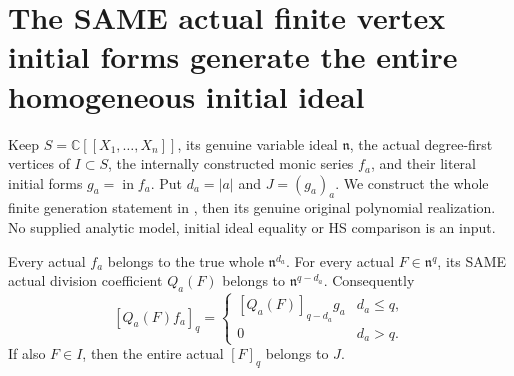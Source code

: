 \section{The SAME actual finite vertex initial forms generate the entire homogeneous initial ideal}

Keep $S=\mathbb C[[X_1,\ldots,X_n]]$, its genuine variable ideal
$\mathfrak n$, the actual degree-first vertices of $I\subset S$,
the internally constructed monic series $f_a$, and their literal initial
forms $g_a=\operatorname{in}f_a$. Put $d_a=|a|$ and $J=(g_a)_a$.
We construct the whole finite generation statement in
\cite[Remark~7.6, p.~263]{bierstone-milman97-invent-math}, then its
genuine original polynomial realization. No supplied analytic model,
initial ideal equality or HS comparison is an input.

\begin{lemma}
\label{hir:actual-finite-initial-span-member-components}
Every actual $f_a$ belongs to the true whole $\mathfrak n^{d_a}$.
For every actual $F\in\mathfrak n^q$, its SAME actual division
coefficient $Q_a(F)$ belongs to $\mathfrak n^{q-d_a}$. Consequently
\[
 [Q_a(F)f_a]_q=
 \begin{cases}[Q_a(F)]_{q-d_a}g_a&d_a\le q,\\0&d_a>q.\end{cases}
\]
If also $F\in I$, then the entire actual $[F]_q$ belongs to $J$.
\leanok
\end{lemma}
